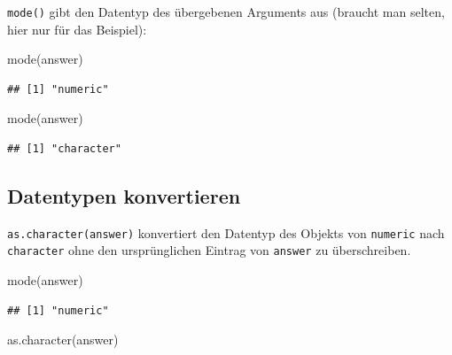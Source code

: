 \documentclass[
]{book}
\newenvironment{Shaded}{\begin{snugshade}}{\end{snugshade}}
\newcommand{\FunctionTok}[1]{\textcolor[rgb]{0.00,0.00,0.00}{#1}}
\newcommand{\NormalTok}[1]{#1}
\newcommand{\StringTok}[1]{\textcolor[rgb]{0.31,0.60,0.02}{#1}}
\begin{document}
\texttt{mode()} gibt den Datentyp des übergebenen Arguments aus (braucht man selten, hier nur für das Beispiel):

\begin{Shaded}
\begin{Highlighting}[]
\FunctionTok{mode}\NormalTok{(answer)}
\end{Highlighting}
\end{Shaded}

\begin{verbatim}
## [1] "numeric"
\end{verbatim}

\begin{Shaded}
\begin{Highlighting}[]
\FunctionTok{mode}\NormalTok{(}\StringTok{\textquotesingle{}answer\textquotesingle{}}\NormalTok{)}
\end{Highlighting}
\end{Shaded}

\begin{verbatim}
## [1] "character"
\end{verbatim}

\hypertarget{datentypen-konvertieren}{%
\subsection*{Datentypen konvertieren}\label{datentypen-konvertieren}}

\scriptsize

\texttt{as.character(answer)} konvertiert den Datentyp des Objekts von \texttt{numeric} nach \texttt{character} ohne den ursprünglichen Eintrag von \texttt{answer} zu überschreiben.

\begin{Shaded}
\begin{Highlighting}[]
\FunctionTok{mode}\NormalTok{(answer)}
\end{Highlighting}
\end{Shaded}

\begin{verbatim}
## [1] "numeric"
\end{verbatim}

\begin{Shaded}
\begin{Highlighting}[]
\FunctionTok{as.character}\NormalTok{(answer)}
\end{Highlighting}
\end{Shaded}
\end{document}
